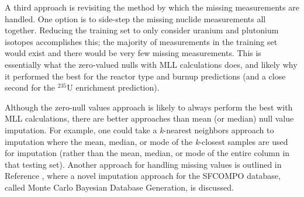 A third approach is revisiting the method by which the missing measurements are
handled.  One option is to side-step the missing nuclide measurements all
together.  Reducing the training set to only consider uranium and plutonium
isotopes accomplishes this; the majority of measurements in the training set
would exist and there would be very few missing measurements.  This is
essentially what the zero-valued nulls with \gls{MLL} calculations does, and
likely why it performed the best for the reactor type and burnup predictions
(and a close second for the ${}^{235}\text{U}$ enrichment prediction). 

Although the zero-null values approach is likely to always perform the best
with \gls{MLL} calculations, there are better approaches than mean (or median)
null value imputation. For example, one could take a \textit{k}-nearest
neighbors approach to imputation where the mean, median, or mode of the
\textit{k}-closest samples are used for imputation (rather than the mean,
median, or mode of the entire column in that testing set). Another approach for
handling missing values is outlined in Reference \cite{nf_missingdata}, where a
novel imputation approach for the \gls{SFCOMPO} database, called Monte Carlo
Bayesian Database Generation, is discussed.

